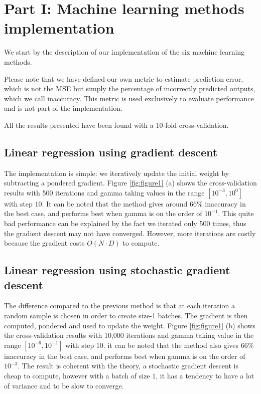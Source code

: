 \documentclass[10pt,conference,compsocconf]{IEEEtran}
\begin{document}
\section{Part I: Machine learning methods implementation}
We start by the description of our implementation of the six machine learning methods.

Please note that we have defined our own metric to estimate prediction error, which
is not the MSE but simply the percentage of incorrectly predicted outputs, which
we call inaccuracy.
This metric is used exclusively to evaluate performance and is not part of the
implementation.

All the results presented have been found with a 10-fold cross-validation.

\subsection{Linear regression using gradient descent}
The implementation is simple: we iteratively update the initial weight by
subtracting a pondered gradient.
Figure \ref{fig:figure1} (a) shows the cross-validation results with 500
iterations and gamma taking values in the range $[10^{-3}, 10^{0}]$ with step
$10$. It can be noted that the method gives around 66\% inaccuracy in the best
case, and performs best when gamma is on the order of $10^{-1}$. This quite bad
performance can be explained by the fact we iterated only 500 times, thus
the gradient descent may not have converged. However, more iterations are costly
because the gradient costs $O(N\cdot D)$ to compute.

\subsection{Linear regression using stochastic gradient descent}
The difference compared to the previous method is that at each iteration a
random sample is chosen in order to
create size-1 batches. The gradient is then computed, pondered and used to
update the weight. Figure \ref{fig:figure1} (b) shows the cross-validation
results with 10,000 iterations and gamma taking value in the range $[10^{-6},
10^{-1}]$ with step $10$. it can be noted that the method also gives $66$\%
inaccuracy in the best case, and performs best when gamma is on the order of
$10^{-3}$. The result is coherent with the theory, a stochastic gradient descent
is cheap to compute, however with a batch of size $1$, it has a tendency to have a
lot of variance and to be slow to converge.
\end{document}

